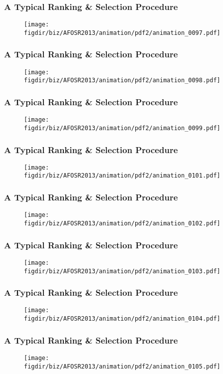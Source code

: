 \documentclass[13pt]{beamer}
\newcommand{\figdir}{../../fig}
\begin{document}
\begin{frame}\frametitle{A Typical Ranking \& Selection Procedure}\begin{figure}\texttt{[image: \\figdir/biz/AFOSR2013/animation/pdf2/animation\_0097.pdf]}\end{figure}\end{frame}
\begin{frame}\frametitle{A Typical Ranking \& Selection Procedure}\begin{figure}\texttt{[image: \\figdir/biz/AFOSR2013/animation/pdf2/animation\_0098.pdf]}\end{figure}\end{frame}
\begin{frame}\frametitle{A Typical Ranking \& Selection Procedure}\begin{figure}\texttt{[image: \\figdir/biz/AFOSR2013/animation/pdf2/animation\_0099.pdf]}\end{figure}\end{frame}
\begin{frame}\frametitle{A Typical Ranking \& Selection Procedure}\begin{figure}\texttt{[image: \\figdir/biz/AFOSR2013/animation/pdf2/animation\_0101.pdf]}\end{figure}\end{frame}
\begin{frame}\frametitle{A Typical Ranking \& Selection Procedure}\begin{figure}\texttt{[image: \\figdir/biz/AFOSR2013/animation/pdf2/animation\_0102.pdf]}\end{figure}\end{frame}
\begin{frame}\frametitle{A Typical Ranking \& Selection Procedure}\begin{figure}\texttt{[image: \\figdir/biz/AFOSR2013/animation/pdf2/animation\_0103.pdf]}\end{figure}\end{frame}
\begin{frame}\frametitle{A Typical Ranking \& Selection Procedure}\begin{figure}\texttt{[image: \\figdir/biz/AFOSR2013/animation/pdf2/animation\_0104.pdf]}\end{figure}\end{frame}
\begin{frame}\frametitle{A Typical Ranking \& Selection Procedure}\begin{figure}\texttt{[image: \\figdir/biz/AFOSR2013/animation/pdf2/animation\_0105.pdf]}\end{figure}\end{frame}
\end{document}
